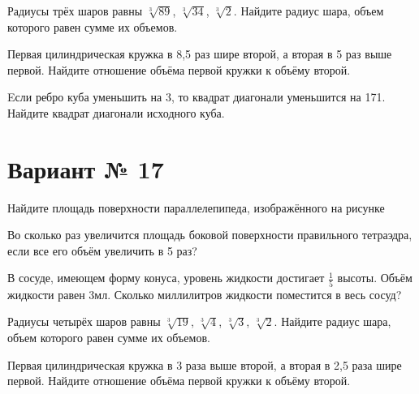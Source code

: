 \documentclass[4apaper]{article}
\begin{document}
\begin{taskBN}{4}
Радиусы трёх шаров равны $\sqrt[3]{89}$, $\sqrt[3]{34}$, $\sqrt[3]{2}$. Найдите радиус шара, объем которого равен сумме их объемов.
\end{taskBN}

\begin{taskBN}{5}
 Первая цилиндрическая кружка в 8,5 раз шире второй, а вторая в 5 раз выше первой. Найдите отношение объёма первой кружки к объёму второй.
\end{taskBN}

\begin{taskBN}{6}
Eсли ребро куба уменьшить на 3, то квадрат диагонали уменьшится на 171. Найдите квадрат диагонали исходного куба.
\end{taskBN}
\newpage\section*{Вариант № 17}

\begin{taskBN}{1}
Найдите площадь поверхности параллелепипеда, изображённого на рисунке
\end{taskBN}

\begin{taskBN}{2}
Во сколько раз увеличится площадь боковой поверхности правильного тетраэдра, если все его объём увеличить в 5 раз?
\end{taskBN}

\begin{taskBN}{3}
В сосуде, имеющем форму конуса, уровень жидкости достигает $\frac{1}{5}$ высоты. Объём жидкости равен 3мл. Сколько миллилитров жидкости поместится в весь сосуд?
\end{taskBN}

\begin{taskBN}{4}
Радиусы четырёх шаров равны $\sqrt[3]{19}$, $\sqrt[3]{4}$, $\sqrt[3]{3}$, $\sqrt[3]{2}$. Найдите радиус шара, объем которого равен сумме их объемов.
\end{taskBN}

\begin{taskBN}{5}
 Первая цилиндрическая кружка в 3 раза выше второй, а вторая в 2,5 раза шире первой. Найдите отношение объёма первой кружки к объёму второй.
\end{taskBN}
\end{document}
